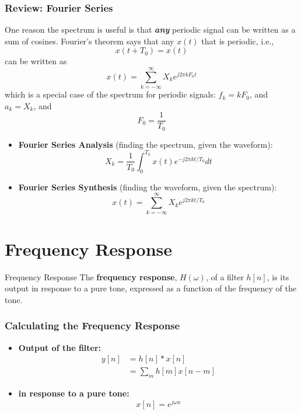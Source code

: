 \documentclass{beamer}
\begin{document}
\begin{frame}
  \frametitle{Review: Fourier Series}

  One reason the spectrum is useful is that {\bf\em any} periodic
  signal can be written as a sum of cosines.  Fourier's theorem says that
  any $x(t)$ that is periodic, i.e.,
  \[
  x(t+T_0) = x(t)
  \]
  can be written as
  \[
  x(t) = \sum_{k=-\infty}^\infty X_k e^{j2\pi k F_0 t}
  \]
  which is a special case of the spectrum for periodic signals:
  $f_k=kF_0$, and $a_k=X_k$, and
  \[
  F_0 = \frac{1}{T_0}
  \]
\end{frame}

\begin{frame}
  \begin{itemize}
  \item {\bf Fourier Series Analysis}  (finding the spectrum, given the waveform):
    \[
    X_k = \frac{1}{T_0}\int_0^{T_0} x(t)e^{-j2\pi kt/T_0}dt
    \]
  \item {\bf Fourier Series Synthesis}  (finding the waveform, given the spectrum):
    \[
    x(t) = \sum_{k=-\infty}^\infty X_k e^{j2\pi kt/T_0}
    \]
  \end{itemize}
\end{frame}  

\section[Frequency Response]{Frequency Response}
\setcounter{subsection}{1}

\begin{frame}
  \begin{block}{Frequency Response}
    The {\bf frequency response}, $H(\omega)$, of a filter $h[n]$, is
    its output in response to a pure tone, expressed as a function of
    the frequency of the tone.
  \end{block}
\end{frame}

\begin{frame}
  \frametitle{Calculating the Frequency Response}
  \begin{itemize}
  \item {\bf Output of the filter:}
    \begin{align*}
      y[n] &= h[n]\ast x[n]\\
      &= \sum_m h[m] x[n-m]
    \end{align*}
  \item {\bf in response to a pure tone:}
    \[
    x[n] = e^{j\omega n}
    \]
  \end{itemize}
\end{frame}
\end{document}
